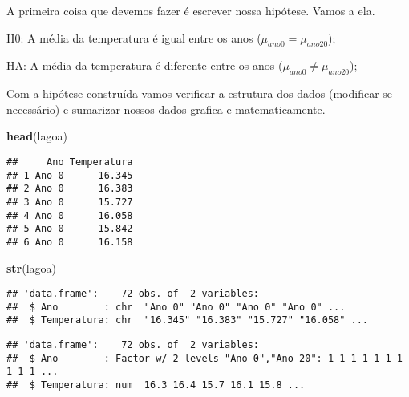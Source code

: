 \documentclass[titlepage, oneside, openany, a4paper]{book}
\newenvironment{Shaded}{\begin{snugshade}}{\end{snugshade}}
\newcommand{\KeywordTok}[1]{\textcolor[rgb]{0.13,0.29,0.53}{\textbf{#1}}}
\newcommand{\NormalTok}[1]{#1}
\newcommand{\OperatorTok}[1]{\textcolor[rgb]{0.81,0.36,0.00}{\textbf{#1}}}
\newcommand{\StringTok}[1]{\textcolor[rgb]{0.31,0.60,0.02}{#1}}
\begin{document}
A primeira coisa que devemos fazer é escrever nossa hipótese. Vamos a ela.

H0: A média da temperatura é igual entre os anos (\(\mu_{ano0} = \mu_{ano 20}\));

HA: A média da temperatura é diferente entre os anos (\(\mu_{ano0} \neq \mu_{ano 20}\));

Com a hipótese construída vamos verificar a estrutura dos dados (modificar se necessário) e sumarizar nossos dados grafica e matematicamente.

\begin{Shaded}
\begin{Highlighting}[]
\KeywordTok{head}\NormalTok{(lagoa)}
\end{Highlighting}
\end{Shaded}

\begin{verbatim}
##     Ano Temperatura
## 1 Ano 0      16.345
## 2 Ano 0      16.383
## 3 Ano 0      15.727
## 4 Ano 0      16.058
## 5 Ano 0      15.842
## 6 Ano 0      16.158
\end{verbatim}

\begin{Shaded}
\begin{Highlighting}[]
\KeywordTok{str}\NormalTok{(lagoa)}
\end{Highlighting}
\end{Shaded}

\begin{verbatim}
## 'data.frame':    72 obs. of  2 variables:
##  $ Ano        : chr  "Ano 0" "Ano 0" "Ano 0" "Ano 0" ...
##  $ Temperatura: chr  "16.345" "16.383" "15.727" "16.058" ...
\end{verbatim}

\begin{Shaded}
\end{Shaded}

\begin{verbatim}
## 'data.frame':    72 obs. of  2 variables:
##  $ Ano        : Factor w/ 2 levels "Ano 0","Ano 20": 1 1 1 1 1 1 1 1 1 1 ...
##  $ Temperatura: num  16.3 16.4 15.7 16.1 15.8 ...
\end{verbatim}
\end{document}
